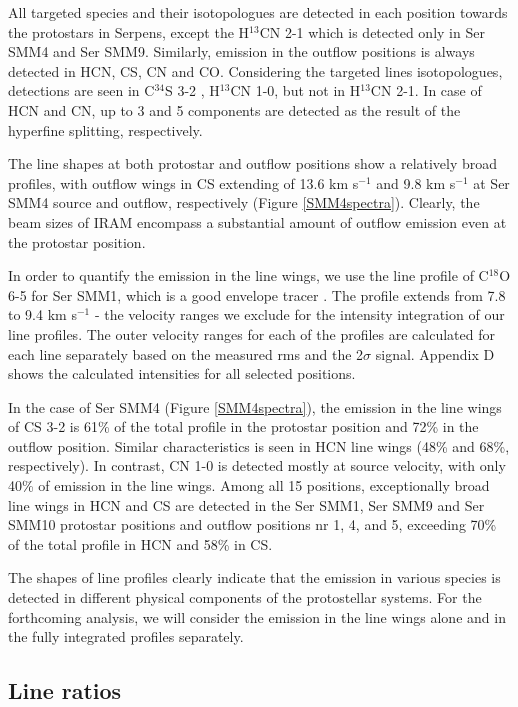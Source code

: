 \documentclass{aa}
\begin{document}
All targeted species and their isotopologues are detected in each position 
towards the protostars in Serpens, except the H$^{13}$CN 2-1 which is detected only in Ser SMM4 and Ser SMM9. Similarly, emission in the outflow 
positions is always detected in HCN, CS, CN and CO. Considering the targeted lines isotopologues, detections are seen in C$^{34}$S 3-2 , H$^{13}$CN 1-0, but not in H$^{13}$CN 2-1.
In case of HCN and CN, up to 3 and 5 components are detected as the result of the hyperfine splitting, respectively. 

The line shapes at both protostar and outflow positions show a relatively broad profiles, 
with outflow wings in CS extending of 13.6 km s$^{-1}$ and 9.8 km s$^{-1}$ at Ser SMM4 
source and outflow, respectively (Figure \ref{SMM4spectra}). Clearly, the beam sizes of 
IRAM encompass a substantial amount of outflow emission even at the protostar position. 

In order to quantify the emission in the line wings, we use the line profile of C$^{18}$O 6-5
for Ser SMM1, which is a good envelope tracer \citep{Arc06}. The profile extends from 
7.8 to 9.4 km s$^{-1}$ - the velocity ranges we exclude for the intensity integration of our line profiles. The outer velocity ranges for each of the profiles are calculated 
for each line separately based on the measured rms and the 2$\sigma$ signal. Appendix D shows the calculated intensities for all selected positions.

In the case of Ser SMM4 (Figure \ref{SMM4spectra}), the emission in the line wings
of CS 3-2 is 61\% of the total profile 
in the protostar position and 72\% in the outflow position. Similar characteristics is 
seen in HCN line wings (48\% and 68\%, respectively). In contrast, CN 1-0 is detected 
mostly at source velocity, with only 40\% of emission in the line wings. Among all 15
positions, exceptionally broad line wings in HCN and CS are detected in 
the Ser SMM1, Ser SMM9 and Ser SMM10 protostar positions and outflow positions 
nr 1, 4, and 5, exceeding 70\% of the total profile in HCN and 58\% in CS.

The shapes of line profiles clearly indicate that the emission in various species is 
detected in different physical components of the protostellar systems. For the
forthcoming analysis, we will consider the emission in the line wings alone and in 
the fully integrated profiles separately.

\subsection{Line ratios}
\label{subsection:ratios}
\end{document}
